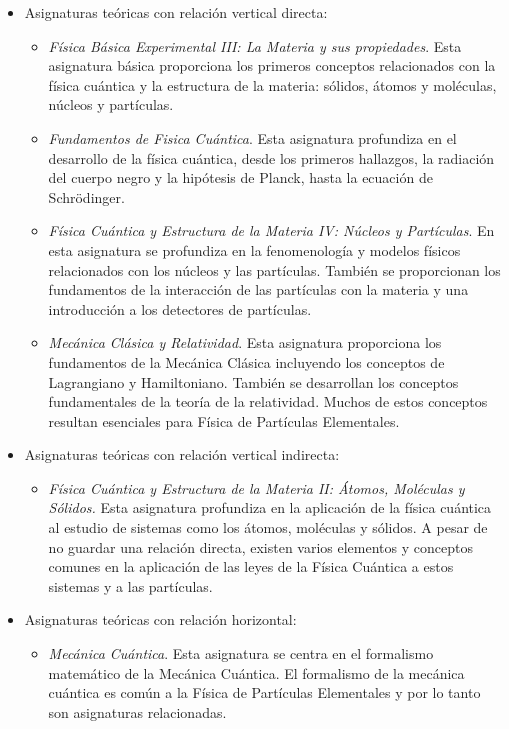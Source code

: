 \begin{itemize}
\item Asignaturas teóricas con relación vertical directa:
    \begin{itemize}
    \item \emph{Física Básica Experimental III: La Materia y sus propiedades}. Esta asignatura básica proporciona los primeros conceptos relacionados con la física cuántica y la estructura de la materia: sólidos, átomos y moléculas, núcleos y partículas. 
    \item \emph{Fundamentos de Fisica Cuántica}. Esta asignatura profundiza en el desarrollo de la física cuántica, desde los primeros hallazgos, la radiación del cuerpo negro y la hipótesis de Planck, hasta la ecuación de Schrödinger.
    \item \emph{Física Cuántica y Estructura de la Materia IV: Núcleos y Partículas}. En esta asignatura se profundiza en la fenomenología y modelos físicos relacionados con los núcleos y las partículas. También se proporcionan los fundamentos de la interacción de las partículas con la materia y una introducción a los detectores de partículas.
    \item \emph{Mecánica Clásica y Relatividad}. Esta asignatura proporciona los fundamentos de la Mecánica Clásica incluyendo los conceptos de Lagrangiano y Hamiltoniano. También se desarrollan los conceptos fundamentales de la teoría de la relatividad. Muchos de estos conceptos resultan esenciales para Física de Partículas Elementales. 
    \end{itemize}
\item Asignaturas teóricas con relación vertical indirecta:
    \begin{itemize}
    \item \emph{Física Cuántica y Estructura de la Materia II: Átomos, Moléculas y Sólidos.} Esta asignatura profundiza en la aplicación de la física cuántica al estudio de sistemas como los átomos, moléculas y sólidos. A pesar de no guardar una relación directa, existen varios elementos y conceptos comunes en la aplicación de las leyes de la Física Cuántica a estos sistemas y a las partículas.
    \end{itemize}
\item Asignaturas teóricas con relación horizontal:
    \begin{itemize}
    \item \emph{Mecánica Cuántica}. Esta asignatura se centra en el formalismo matemático de la Mecánica Cuántica. El formalismo de la mecánica cuántica es común a la Física de Partículas Elementales y por lo tanto son asignaturas relacionadas. 

\end{itemize}
\end{itemize}
